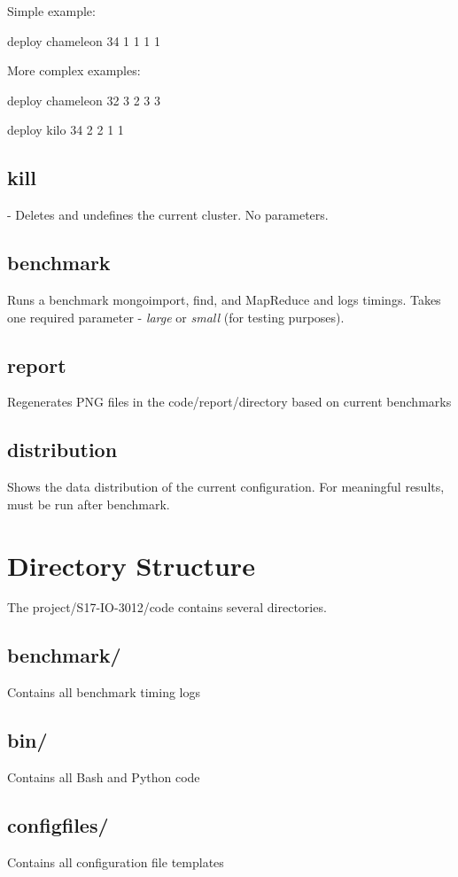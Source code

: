 \documentclass[9pt,twocolumn,twoside]{../../styles/osajnl}
\begin{document}
Simple example:

deploy chameleon 34 1 1 1 1

More complex examples: 

deploy chameleon 32 3 2 3 3

deploy kilo 34 2 2 1 1


\subsection{kill} - Deletes and undefines the current cluster.  No parameters.

\subsection{benchmark}

Runs a benchmark mongoimport, find, and MapReduce and logs timings.
Takes one required parameter - \emph{large} or \emph{small} (for
testing purposes).

\subsection{report}

Regenerates PNG files in the code/report/directory based on current
benchmarks

\subsection{distribution}

Shows the data distribution of the current configuration. For
meaningful results, must be run after benchmark.

\section{Directory Structure}

The project/S17-IO-3012/code contains several directories.   

\subsection{benchmark/} Contains all benchmark timing logs  
\subsection{bin/} Contains all Bash and Python code
\subsection{configfiles/} Contains all configuration file templates
\end{document}
